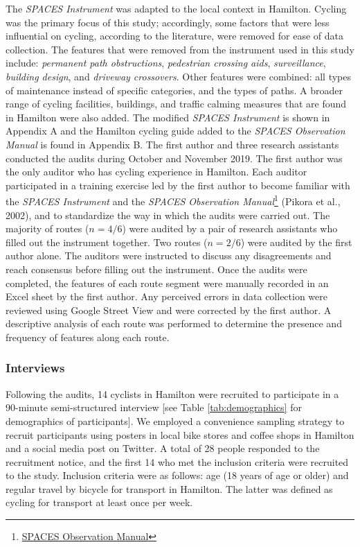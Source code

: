 \documentclass[]{elsarticle} %
\begin{document}
The \emph{SPACES Instrument} was adapted to the local context in
Hamilton. Cycling was the primary focus of this study; accordingly, some
factors that were less influential on cycling, according to the
literature, were removed for ease of data collection. The features that
were removed from the instrument used in this study include:
\emph{permanent path obstructions}, \emph{pedestrian crossing aids},
\emph{surveillance}, \emph{building design}, and \emph{driveway
crossovers}. Other features were combined: all types of maintenance
instead of specific categories, and the types of paths. A broader range
of cycling facilities, buildings, and traffic calming measures that are
found in Hamilton were also added. The modified \emph{SPACES Instrument}
is shown in Appendix A and the Hamilton cycling guide added to the
\emph{SPACES Observation Manual} is found in Appendix B. The first
author and three research assistants conducted the audits during October
and November 2019. The first author was the only auditor who has cycling
experience in Hamilton. Each auditor participated in a training exercise
led by the first author to become familiar with the \emph{SPACES
Instrument} and the \emph{SPACES Observation Manual}\footnote{\href{https://activelivingresearch.org/sites/activelivingresearch.org/files/SPACES_Observation_Manual.pdf}{SPACES
  Observation Manual}} (Pikora et al., 2002), and to standardize the way
in which the audits were carried out. The majority of routes
(\(n = 4/6\)) were audited by a pair of research assistants who filled
out the instrument together. Two routes (\(n = 2/6\)) were audited by
the first author alone. The auditors were instructed to discuss any
disagreements and reach consensus before filling out the instrument.
Once the audits were completed, the features of each route segment were
manually recorded in an Excel sheet by the first author. Any perceived
errors in data collection were reviewed using Google Street View and
were corrected by the first author. A descriptive analysis of each route
was performed to determine the presence and frequency of features along
each route.

\hypertarget{interviews}{%
\subsubsection{Interviews}\label{interviews}}

Following the audits, 14 cyclists in Hamilton were recruited to
participate in a 90-minute semi-structured interview {[}see Table
\ref{tab:demographics} for demographics of participants{]}. We employed
a convenience sampling strategy to recruit participants using posters in
local bike stores and coffee shops in Hamilton and a social media post
on Twitter. A total of 28 people responded to the recruitment notice,
and the first 14 who met the inclusion criteria were recruited to the
study. Inclusion criteria were as follows: age (18 years of age or
older) and regular travel by bicycle for transport in Hamilton. The
latter was defined as cycling for transport at least once per week.
\end{document}
